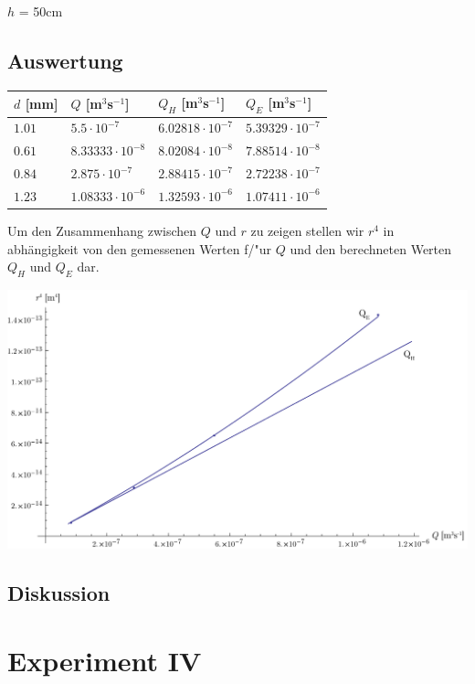 \documentclass[12pt,a4paper]{article}
\begin{document}
\vspace{5pt}
$h$ = 50cm

\subsection*{Auswertung}
\begin{tabular}{|l|l|l|l|}
\hline
$d$ [mm]&$Q$ [m$^3$s$^{-1}$]&$Q_H$ [m$^3$s$^{-1}$]&$Q_E$ [m$^3$s$^{-1}$]\\
\hline
$1.01$&$5.5\cdot 10^{-7}$&$6.02818\cdot 10^{-7}$&$5.39329\cdot 10^{-7}$\\
$0.61$&$8.33333\cdot 10^{-8}$&$8.02084\cdot 10^{-8}$&$7.88514\cdot 10^{-8}$\\
$0.84$&$2.875\cdot 10^{-7}$&$2.88415\cdot 10^{-7}$&$2.72238\cdot 10^{-7}$\\
$1.23$&$1.08333\cdot 10^{-6}$&$1.32593\cdot 10^{-6}$&$1.07411\cdot 10^{-6}$\\
\hline
\end{tabular}
\vspace{5pt}

Um den Zusammenhang zwischen $Q$ und $r$ zu zeigen stellen wir $r^4$ in abh\"angigkeit von den gemessenen Werten f/"ur $Q$ und den berechneten Werten $Q_H$ und $Q_E$ dar.
\begin{center}
\includegraphics[width=15cm]{diagram3.pdf}
\end{center}

\subsection*{Diskussion}


\section*{Experiment IV}
\end{document}
